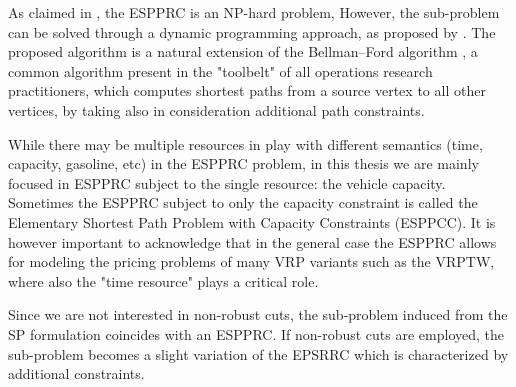 As claimed in \textcite{dror1994}, the ESPPRC is an NP-hard problem,
However, the sub-problem can be solved through a dynamic programming approach, as proposed by \textcite{feillet2004}.
The proposed algorithm is a natural extension of the Bellman–Ford algorithm \parencite{bellman1958, fordjr1956},
a common algorithm present in the "toolbelt" of all operations research practitioners,
which computes shortest paths from a source vertex to all other vertices,
by taking also in consideration additional path constraints.

While there may be multiple resources in play with different semantics
(time, capacity, gasoline, etc)
in the ESPPRC problem,
in this thesis we are mainly focused in ESPPRC subject to the single resource: the vehicle capacity.
Sometimes the ESPPRC subject to only the capacity constraint is called the Elementary Shortest
Path Problem with Capacity Constraints (ESPPCC).
It is however important to acknowledge that in the general case the ESPPRC allows for modeling
the pricing problems of many VRP variants such as the VRPTW, where also the "time resource"
plays a critical role.

Since we are not interested in non-robust cuts, the sub-problem
induced from the SP formulation coincides with an ESPPRC.
If non-robust cuts are employed, the sub-problem becomes
a slight variation of the EPSRRC which is characterized by additional constraints.

\begin{comment}
\cite{bettinelli2010mathematical} ---------------
It is possible to address the pricing problem by optimizing its relaxation,
obtained by dropping the elementarity constraints. Solving a resource con-
strained shortest path problem (RCSPP) requires less computing time but
yields less tight lower bounds, since columns may include cycles. The two
different approaches have been followed for instance by Feillet et al. [42] and
Desrochers et al. [29] to solve the vehicle routing problem with time windows
(VRPTW) through column generation.
\end{comment}

